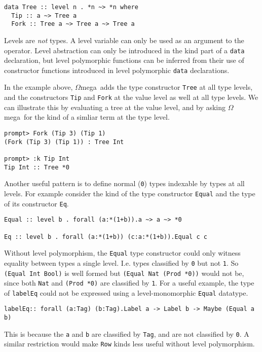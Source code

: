 \documentclass[11pt,twoside]{article}
\newcommand{\om}{$\Omega$mega}
\begin{document}
\begin{verbatim}
data Tree :: level n . *n ~> *n where
  Tip :: a ~> Tree a
  Fork :: Tree a ~> Tree a ~> Tree a
\end{verbatim}
\noindent
Levels are {\it not} types. A level variable can only be used
as an argument to the {\tt *} operator. Level abstraction can only
be introduced in the kind part of a {\tt data} declaration, but level polymorphic
functions can be inferred from their use of constructor functions
introduced in level polymorphic {\tt data} declarations.

In the example above,
\om\ adds the type constructor {\tt Tree} at all type levels,
and the constructors {\tt Tip} and {\tt Fork} at the value level
as well at all type levels. We can illustrate this by evaluating
a tree at the value level, and by asking \om\ for the kind of
a simliar term at the type level.

\begin{verbatim}
prompt> Fork (Tip 3) (Tip 1)
(Fork (Tip 3) (Tip 1)) : Tree Int

prompt> :k Tip Int
Tip Int :: Tree *0 
\end{verbatim}

Another useful pattern is to define normal ({\tt *0}) types indexable
by types at all levels. For example consider the kind of the type constructor
{\tt Equal} and the type of its constructor {\tt Eq}.

\begin{verbatim}
Equal :: level b . forall (a:*(1+b)).a ~> a ~> *0

Eq :: level b . forall (a:*(1+b)) (c:a:*(1+b)).Equal c c
\end{verbatim}
Without level polymorphism, the {\tt Equal} type constructor could only
witness equality between types a single level. I.e. types classified by
{\tt *0} but not {\tt *1}. So {\tt (Equal Int Bool)} is well formed
but {\tt (Equal Nat (Prod *0))} would not be, since both {\tt Nat}
and {\tt (Prod *0)} are classified by {\tt *1}. For a useful
example, the type of {\tt labelEq} could not be expressed
using a level-monomorphic {\tt Equal} datatype.

\begin{verbatim}
labelEq:: forall (a:Tag) (b:Tag).Label a -> Label b -> Maybe (Equal a b)
\end{verbatim}
\noindent
This is because the {\tt a} and {\tt b} are classified by {\tt Tag}, and are not classified by {\tt *0}. A similar restriction would make
{\tt Row} kinds less useful without level polymorphism.
\end{document}
